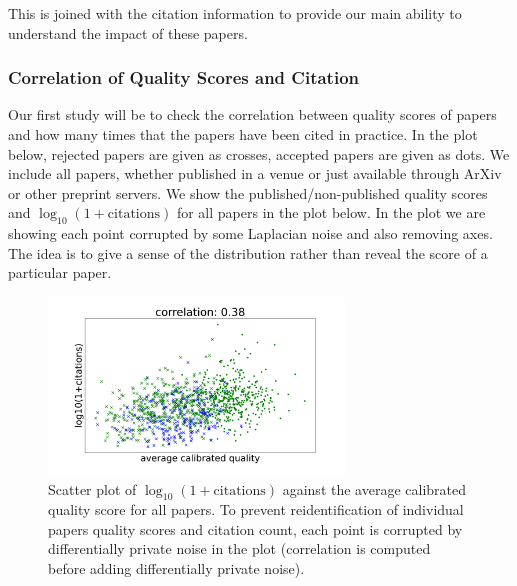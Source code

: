 This is joined with the citation information to provide our main ability
to understand the impact of these papers.

\begin{Shaded}
\begin{Highlighting}[]
\OperatorTok{=}
\end{Highlighting}
\end{Shaded}

\hypertarget{correlation-of-quality-scores-and-citation}{%
\subsubsection{Correlation of Quality Scores and
Citation}\label{correlation-of-quality-scores-and-citation}}

Our first study will be to check the correlation between quality scores
of papers and how many times that the papers have been cited in
practice. In the plot below, rejected papers are given as crosses,
accepted papers are given as dots. We include all papers, whether
published in a venue or just available through ArXiv or other preprint
servers. We show the published/non-published quality scores and
\(\log_{10}(1+\text{citations})\) for all papers in the plot below. In
the plot we are showing each point corrupted by some Laplacian noise and
also removing axes. The idea is to give a sense of the distribution
rather than reveal the score of a particular paper.

\begin{figure}[htb]
\includegraphics[width=0.70\textwidth]{diagrams/neurips/citations-vs-average-calibrated-quality-all.pdf}


\caption{Scatter plot of $\log_{10}(1+\text{citations})$ against the average calibrated quality score for all papers. To prevent reidentification of individual papers quality scores and citation count, each point is corrupted by differentially private noise in the plot (correlation is computed before adding differentially private noise).}
\label{citations-vs-average-calibrated-quality-all}
\end{figure}

